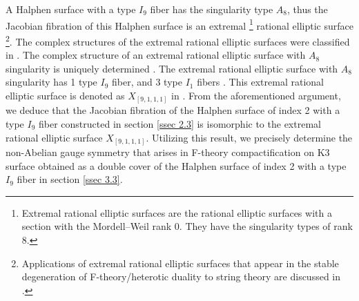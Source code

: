 \documentclass[12pt]{article}
\begin{document}
\par A Halphen surface with a type $I_9$ fiber has the singularity type $A_8$, thus the Jacobian fibration of this Halphen surface is an extremal \footnote{Extremal rational elliptic surfaces are the rational elliptic surfaces with a section with the Mordell--Weil rank 0. They have the singularity types of rank 8.} rational elliptic surface \footnote{Applications of extremal rational elliptic surfaces that appear in the stable degeneration \cite{FMW, AM} of F-theory/heterotic duality \cite{Vaf, MV1, MV2, Sen, FMW} to string theory are discussed in \cite{Kimura1710}.}. The complex structures of the extremal rational elliptic surfaces were classified in \cite{MP}. The complex structure of an extremal rational elliptic surface with $A_8$ singularity is uniquely determined \cite{MP}. The extremal rational elliptic surface with $A_8$ singularity has 1 type $I_9$ fiber, and 3 type $I_1$ fibers \cite{MP}. This extremal rational elliptic surface is denoted as $X_{[9, 1, 1, 1]}$ in \cite{Kimura1710}. From the aforementioned argument, we deduce that the Jacobian fibration of the Halphen surface of index 2 with a type $I_9$ fiber constructed in section \ref{ssec 2.3} is isomorphic to the extremal rational elliptic surface $X_{[9, 1, 1, 1]}$. Utilizing this result, we precisely determine the non-Abelian gauge symmetry that arises in F-theory compactification on K3 surface obtained as a double cover of the Halphen surface of index 2 with a type $I_9$ fiber in section \ref{ssec 3.3}. 
\end{document}
